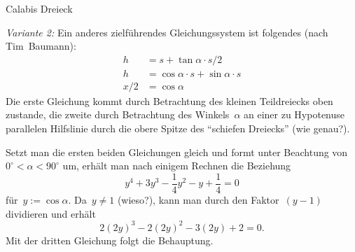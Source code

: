 \documentclass{algblatt}
\begin{document}
\begin{aufgabe}{Calabis Dreieck}
\begin{loesung}
\emph{Variante 2:} Ein anderes zielführendes Gleichungssystem ist folgendes
(nach Tim~Baumann):
\begin{align*}
  h &= s + \tan\alpha \cdot s/2 \\
  h &= \cos\alpha \cdot s + \sin\alpha \cdot s \\
  x/2 &= \cos\alpha
\end{align*}
Die erste Gleichung kommt durch Betrachtung des kleinen Teildreiecks oben
zustande, die zweite durch Betrachtung des Winkels~$\alpha$ an einer zu
Hypotenuse parallelen Hilfslinie durch die obere Spitze des "`schiefen
Dreiecks"' (wie genau?).

Setzt man die ersten beiden Gleichungen gleich und formt unter Beachtung
von~$0^\circ < \alpha < 90^\circ$ um, erhält man nach
einigem Rechnen die Beziehung
\[ y^4 + 3y^3 - \frac{1}{4}y^2 - y + \frac{1}{4} = 0 \]
für~$y := \cos\alpha$. Da~$y \neq 1$ (wieso?), kann man durch den
Faktor~$(y-1)$ dividieren und erhält
\[ 2 (2y)^3 - 2(2y)^2 - 3 (2y) + 2 = 0. \]
Mit der dritten Gleichung folgt die Behauptung.
\end{loesung}
\end{aufgabe}
\end{document}
